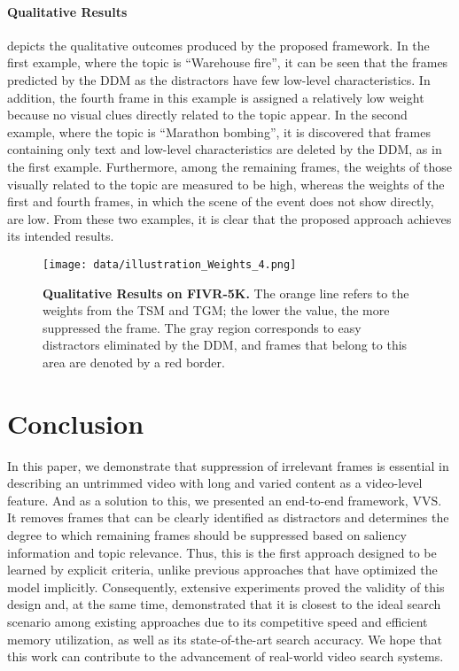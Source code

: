 \documentclass[10pt,twocolumn,letterpaper]{article}
\begin{document}
        \paragraph{Qualitative Results \\}
             depicts the qualitative outcomes produced by the proposed framework. In the first example, where the topic is ``Warehouse fire'', it can be seen that the frames predicted by the DDM as the distractors have few low-level characteristics. In addition, the fourth frame in this example is assigned a relatively low weight because no visual clues directly related to the topic appear. In the second example, where the topic is ``Marathon bombing'', it is discovered that frames containing only text and low-level characteristics are deleted by the DDM, as in the first example. Furthermore, among the remaining frames, the weights of those visually related to the topic are measured to be high, whereas the weights of the first and fourth frames, in which the scene of the event does not show directly, are low. From these two examples, it is clear that the proposed approach achieves its intended results. \vspace{-3mm}
    

    \begin{figure}[t!]
        \centering
        \texttt{[image: data/illustration\_Weights\_4.png]} 
        \vspace{-6mm}
        \caption{\textbf{Qualitative Results on FIVR-5K.} The orange line refers to the weights from the TSM and TGM; the lower the value, the more suppressed the frame. The gray region corresponds to easy distractors eliminated by the DDM, and frames that belong to this area are denoted by a red border.\vspace{-4mm}}
        \label{fig:qual}
    \end{figure}

\section{Conclusion}
    \vspace{-2mm}
    In this paper, we demonstrate that suppression of irrelevant frames is essential in describing an untrimmed video with long and varied content as a video-level feature. And as a solution to this, we presented an end-to-end framework, VVS. It removes frames that can be clearly identified as distractors and determines the degree to which remaining frames should be suppressed based on saliency information and topic relevance. Thus, this is the first approach designed to be learned by explicit criteria, unlike previous approaches that have optimized the model implicitly. Consequently, extensive experiments proved the validity of this design and, at the same time, demonstrated that it is closest to the ideal search scenario among existing approaches due to its competitive speed and efficient memory utilization, as well as its state-of-the-art search accuracy. We hope that this work can contribute to the advancement of real-world video search systems.
\end{document}
